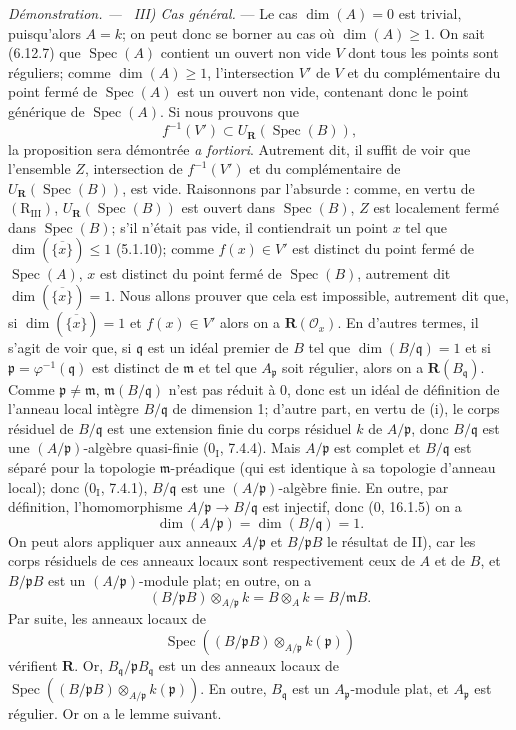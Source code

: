 \documentclass[10pt,oneside]{book}
\newenvironment{proof}{%
  \par\medskip\noindent\textit{Démonstration. ---\ }}{\par}
\begin{document}
\begin{proof}
\emph{III) Cas général.} --- Le cas $\dim(A)=0$ est trivial, puisqu'alors
$A=k$; on peut donc se borner au cas où $\dim(A)\geqslant1$. On sait
(6.12.7) que $\operatorname{Spec}(A)$ contient un ouvert non vide $V$ dont
tous les points sont réguliers; comme $\dim(A)\geqslant1$, l'intersection
$V'$ de $V$ et du complémentaire du point fermé de
$\operatorname{Spec}(A)$ est un ouvert non vide, contenant donc le point
générique de $\operatorname{Spec}(A)$. Si nous prouvons que
\[
f^{-1}(V')\subset U_{\boldsymbol R}(\operatorname{Spec}(B)),
\]
la proposition sera démontrée \emph{a fortiori}. Autrement dit, il suffit de
voir que l'ensemble $Z$, intersection de $f^{-1}(V')$ et du complémentaire
de $U_{\boldsymbol R}(\operatorname{Spec}(B))$, est vide. Raisonnons par
l'absurde : comme, en vertu de $(\mathrm R_{\mathrm{III}})$,
$U_{\boldsymbol R}(\operatorname{Spec}(B))$ est ouvert dans
$\operatorname{Spec}(B)$, $Z$ est localement fermé dans
$\operatorname{Spec}(B)$; s'il n'était pas vide, il contiendrait un point
$x$ tel que $\dim(\overline{\{x\}})\leqslant1$ (5.1.10); comme
$f(x)\in V'$ est distinct du point fermé de $\operatorname{Spec}(A)$, $x$
est distinct du point fermé de $\operatorname{Spec}(B)$, autrement dit
$\dim(\overline{\{x\}})=1$. Nous allons prouver que cela est impossible,
autrement dit que, si $\dim(\overline{\{x\}})=1$ et $f(x)\in V'$ alors on a
$\boldsymbol R(\mathscr O_x)$. En d'autres termes, il s'agit de voir que,
si $\mathfrak q$ est un idéal premier de $B$ tel que
$\dim(B/\mathfrak q)=1$ et si $\mathfrak p=\varphi^{-1}(\mathfrak q)$ est
distinct de $\mathfrak m$ et tel que $A_{\mathfrak p}$ soit régulier, alors
on a $\boldsymbol R(B_{\mathfrak q})$. Comme
$\mathfrak p\ne\mathfrak m$, $\mathfrak m(B/\mathfrak q)$ n'est pas réduit
à 0, donc est un idéal de définition de l'anneau local intègre
$B/\mathfrak q$ de dimension 1; d'autre part, en vertu de (i), le corps
résiduel de $B/\mathfrak q$ est une extension finie du corps résiduel $k$
de $A/\mathfrak p$, donc $B/\mathfrak q$ est une
$(A/\mathfrak p)$-algèbre quasi-finie (0$_{\mathrm I}$, 7.4.4). Mais
$A/\mathfrak p$ est complet et $B/\mathfrak q$ est séparé pour la topologie
$\mathfrak m$-préadique (qui est identique à sa topologie d'anneau local);
donc (0$_{\mathrm I}$, 7.4.1), $B/\mathfrak q$ est une
$(A/\mathfrak p)$-algèbre finie. En outre, par définition,
l'homomorphisme $A/\mathfrak p\to B/\mathfrak q$ est injectif, donc (0,
16.1.5) on a
\[
\dim(A/\mathfrak p)=\dim(B/\mathfrak q)=1.
\]
On peut alors appliquer aux anneaux $A/\mathfrak p$ et
$B/\mathfrak pB$ le résultat de II), car les corps résiduels de ces anneaux
locaux sont respectivement ceux de $A$ et de $B$, et $B/\mathfrak pB$ est
un $(A/\mathfrak p)$-module plat; en outre, on a
\[
(B/\mathfrak pB)\otimes_{A/\mathfrak p}k=B\otimes_A k=B/\mathfrak mB.
\]
Par suite, les anneaux locaux de
\[
\operatorname{Spec}((B/\mathfrak pB)
\otimes_{A/\mathfrak p}k(\mathfrak p))
\]
vérifient $\boldsymbol R$. Or, $B_{\mathfrak q}/\mathfrak pB_{\mathfrak q}$
est un des anneaux locaux de
$\operatorname{Spec}((B/\mathfrak pB)
\otimes_{A/\mathfrak p}k(\mathfrak p))$. En outre,
$B_{\mathfrak q}$ est un $A_{\mathfrak p}$-module plat, et
$A_{\mathfrak p}$ est régulier. Or on a le lemme suivant.


\end{proof}
\end{document}
